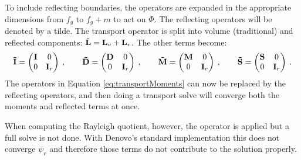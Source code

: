 To include reflecting boundaries, the operators are expanded in the appropriate dimensions from $f_{g}$ to $f_{g} + m$ to act on $\Phi$. The reflecting operators will be denoted by a tilde. The transport operator is split into volume (traditional) and reflected components: $\tilde{\mathbf{L}} = \mathbf{L}_{v} + \mathbf{L}_{r}$. The other terms become:
%
\begin{alignat}{4}
  \mathbf{\tilde{I}} = \begin{pmatrix} \mathbf{I} & 0 \\ 0 & \mathbf{I}_{r} \end{pmatrix} \:, \nonumber
 \qquad
 \mathbf{\tilde{D}} = \begin{pmatrix} \mathbf{D} & 0 \\ 0 & \mathbf{I}_{r} \end{pmatrix} \:, \nonumber
 \qquad
 \mathbf{\tilde{M}} = \begin{pmatrix} \mathbf{M} & 0 \\ 0 & \mathbf{I}_{r} \end{pmatrix} \:, \nonumber
 \qquad
 \mathbf{\tilde{S}} = \begin{pmatrix} \mathbf{S} & 0 \\ 0 & \mathbf{I}_{r} \end{pmatrix} \:. \nonumber
\end{alignat}
%
The operators in Equation \eqref{eq:transportMoments} can now be replaced by the reflecting operators, and then doing a transport solve will converge both the moments and reflected terms at once. 

When computing the Rayleigh quotient, however, the operator is applied but a full solve is not done. With Denovo's standard implementation this does not converge $\psi_{r}$ and therefore those terms do not contribute to the solution properly. 

